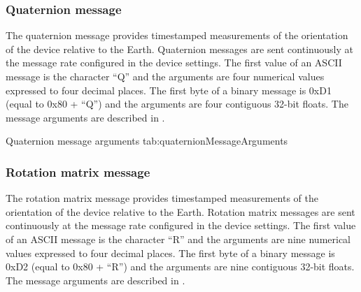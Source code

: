 \subsubsection{Quaternion message}

The quaternion message provides timestamped measurements of the orientation of the device relative to the Earth.  Quaternion messages are sent continuously at the message rate configured in the device settings.  The first value of an \ac{ASCII} message is the character \enquote{Q} and the arguments are four numerical values expressed to four decimal places.  The first byte of a binary message is 0xD1 (equal to 0x80 + \enquote{Q}) and the arguments are four contiguous 32-bit floats.  The message arguments are described in .

\begingroup
    \def\tempArgumentA{Quaternion W element}
    \def\tempArgumentB{Quaternion X element}
    \def\tempArgumentC{Quaternion Y element}
    \def\tempArgumentD{Quaternion Z element}
    \def\tempCaption{Quaternion message arguments}
    \def\tempLabel{tab:quaternionMessageArguments}
    \dataMessageTable
    {Quaternion message arguments}
    {tab:quaternionMessageArguments}
\endgroup

\begingroup
    \def\tempNameA{Quaternion W element}
    \def\tempNameB{Quaternion X element}
    \def\tempNameC{Quaternion Y element}
    \def\tempNameD{Quaternion Z element}
    \def\tempValueA{1}
    \def\tempValueB{0}
    \def\tempValueC{0}
    \def\tempValueD{0}
    \def\tempAsciiFirst{Q}
    \def\tempAsciiA{1.0000}
    \def\tempAsciiB{0.0000}
    \def\tempAsciiC{0.0000}
    \def\tempAsciiD{0.0000}
    \def\tempBinaryFirst{D1}
    \def\tempBinaryA{00 00 80 3F}
    \def\tempBinaryB{00 00 00 00}
    \def\tempBinaryC{00 00 00 00}
    \def\tempBinaryD{00 00 00 00}
    \dataMessageExample
\endgroup

\subsubsection{Rotation matrix message}

The rotation matrix message provides timestamped measurements of the orientation of the device relative to the Earth.  Rotation matrix messages are sent continuously at the message rate configured in the device settings.  The first value of an \ac{ASCII} message is the character \enquote{R} and the arguments are nine numerical values expressed to four decimal places.  The first byte of a binary message is 0xD2 (equal to 0x80 + \enquote{R}) and the arguments are nine contiguous 32-bit floats.  The message arguments are described in .

